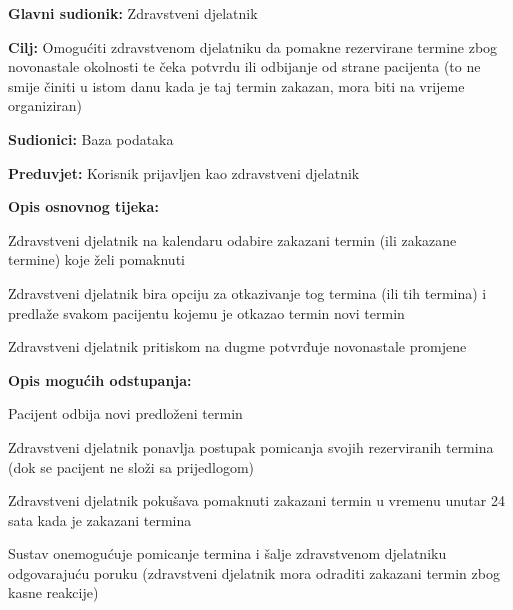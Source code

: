 \noindent {}
\begin{packed_item}
	
	\item \textbf{Glavni sudionik: }Zdravstveni djelatnik
	\item  \textbf{Cilj:} Omogućiti zdravstvenom djelatniku da pomakne rezervirane termine zbog novonastale okolnosti te čeka potvrdu ili odbijanje od strane pacijenta (to ne smije činiti u istom danu kada je taj termin zakazan, mora biti na vrijeme organiziran)
	\item  \textbf{Sudionici:} Baza podataka
	\item  \textbf{Preduvjet:} Korisnik prijavljen kao zdravstveni djelatnik
	\item  \textbf{Opis osnovnog tijeka:}
	
	\item[] \begin{packed_enum}
		
		\item Zdravstveni djelatnik na kalendaru odabire zakazani termin (ili zakazane termine) koje želi pomaknuti
		\item Zdravstveni djelatnik bira opciju za otkazivanje tog termina (ili tih termina) i predlaže svakom pacijentu kojemu je otkazao termin novi termin
		\item Zdravstveni djelatnik pritiskom na dugme potvrđuje novonastale promjene
	\end{packed_enum}
	
	\item  \textbf{Opis mogućih odstupanja:}
	
	\item[] \begin{packed_item}
		
		\item[2.a] Pacijent odbija novi predloženi termin
		\item[] \begin{packed_enum}
			
			\item Zdravstveni djelatnik ponavlja postupak pomicanja svojih rezerviranih termina (dok se pacijent ne složi sa prijedlogom)
			
		\end{packed_enum}
		\item[2.a] Zdravstveni djelatnik pokušava pomaknuti zakazani termin u vremenu unutar 24 sata kada je zakazani termina
		\item[] \begin{packed_enum}
			
			\item Sustav onemogućuje pomicanje termina i šalje zdravstvenom djelatniku odgovarajuću poruku (zdravstveni djelatnik mora odraditi zakazani termin zbog kasne reakcije)
			
		\end{packed_enum}
		
	\end{packed_item}
\end{packed_item}


